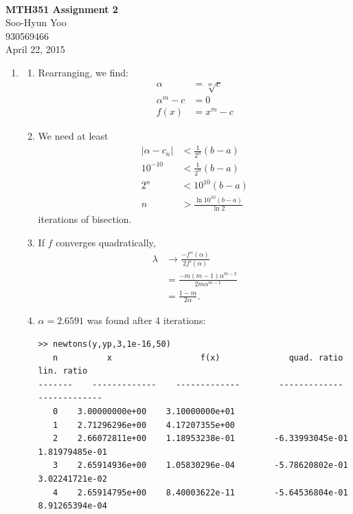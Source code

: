 \documentclass[12pt,letterpaper]{article}
\begin{document}
\fancyfoot{}
\begin{center}
  \hfill \\
  \vspace{4in}
  {\bf\Huge MTH351 Assignment 2} \\
  \vspace{2in}
  {\Large Soo-Hyun Yoo \\ 930569466 \\ April 22, 2015}
\end{center}

\newpage
{}

\begin{enumerate}
  \item
    \begin{enumerate}
      \item Rearranging, we find:
        \begin{align*}
          \alpha &= \sqrt[m]{c} \\
          \alpha^m - c &= 0 \\
          f(x) &= \boxed{x^m - c}
        \end{align*}

      \item We need at least
        \begin{align*}
          |\alpha - c_n| &< \frac{1}{2^n} (b-a) \\
          10^{-10} &< \frac{1}{2^n} (b-a) \\
          2^n &< 10^{10}(b-a) \\
          n &> \boxed{\frac{\ln{10^{10}(b-a)}}{\ln 2}}
        \end{align*}
        iterations of bisection.

      \item If $f$ converges quadratically,
        \begin{align*}
          \lambda &\rightarrow \frac{-f''(\alpha)}{2f'(\alpha)} \\
                  &= \frac{-m(m-1)\alpha^{m-2}}{2m\alpha^{m-1}} \\
                  &= \boxed{\frac{1-m}{2\alpha}}.
        \end{align*}

      \item $\alpha = 2.6591$ was found after 4 iterations:
        {\scriptsize
          \begin{verbatim}
>> newtons(y,yp,3,1e-16,50)
   n          x                  f(x)              quad. ratio          lin. ratio
-------    -------------    -------------        -------------        -------------
   0    3.00000000e+00    3.10000000e+01
   1    2.71296296e+00    4.17207355e+00
   2    2.66072811e+00    1.18953238e-01        -6.33993045e-01        1.81979485e-01
   3    2.65914936e+00    1.05830296e-04        -5.78620802e-01        3.02241721e-02
   4    2.65914795e+00    8.40003622e-11        -5.64536804e-01        8.91265394e-04


\end{verbatim}}
\end{enumerate}
\end{enumerate}
\end{document}
